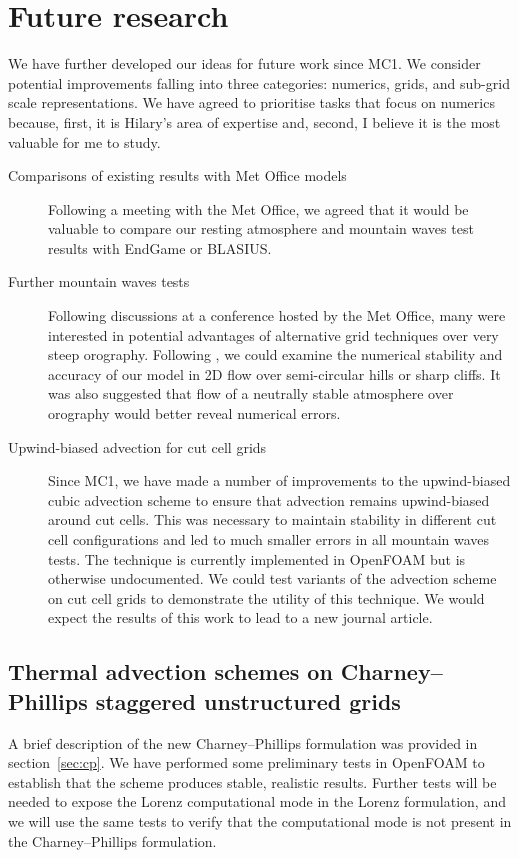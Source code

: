 \documentclass[a4paper]{article}
\begin{document}
\section{Future research}

We have further developed our ideas for future work since MC1.  We consider potential improvements falling into three categories: numerics, grids, and sub-grid scale representations.  We have agreed to prioritise tasks that focus on numerics because, first, it is Hilary's area of expertise and, second, I believe it is the most valuable for me to study.

\begin{description}
	\item[Comparisons of existing results with Met Office models]{Following a meeting with the Met Office, we agreed that it would be valuable to compare our resting atmosphere and mountain waves test results with EndGame or BLASIUS.}
	\item[Further mountain waves tests]{Following discussions at a conference hosted by the Met Office, many were interested in potential advantages of alternative grid techniques over very steep orography.  Following \citet{yamazaki-satomura2010}, we could examine the numerical stability and accuracy of our model in 2D flow over semi-circular hills or sharp cliffs.  It was also suggested that flow of a neutrally stable atmosphere over orography would better reveal numerical errors.}
	\item[Upwind-biased advection for cut cell grids]{Since MC1, we have made a number of improvements to the upwind-biased cubic advection scheme to ensure that advection remains upwind-biased around cut cells.  This was necessary to maintain stability in different cut cell configurations and led to much smaller errors in all mountain waves tests.  The technique is currently implemented in OpenFOAM but is otherwise undocumented.  We could test variants of the advection scheme on cut cell grids to demonstrate the utility of this technique.  We would expect the results of this work to lead to a new journal article.}
\end{description}

\subsection*{Thermal advection schemes on Charney--Phillips staggered unstructured grids}
A brief description of the new Charney--Phillips formulation was provided in section~\ref{sec:cp}.  We have performed some preliminary tests in OpenFOAM to establish that the scheme produces stable, realistic results.  Further tests will be needed to expose the Lorenz computational mode in the Lorenz formulation, and we will use the same tests to verify that the computational mode is not present in the Charney--Phillips formulation.
		
\end{document}
